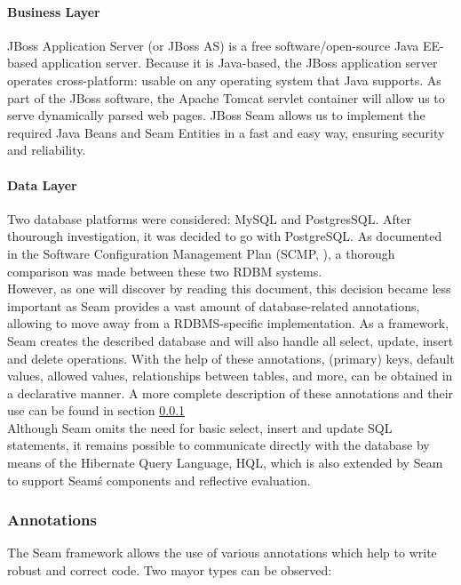 \documentclass[salesmen, twoside]{../../../templates/latex/2009/softproj}
\begin{document}
\begin{projdoc}
\paragraph{Business Layer}
JBoss Application Server (or JBoss AS) is a free software/open-source Java EE-based application server. Because it is Java-based, the JBoss application server operates cross-platform: usable on any operating system that Java supports. 
As part of the JBoss software, the Apache Tomcat servlet container will allow us to serve dynamically parsed web pages.
JBoss Seam allows us to implement the required Java Beans and Seam Entities in a fast and easy way, ensuring security and reliability.

\paragraph{Data Layer}
Two database platforms were considered: MySQL and PostgresSQL. After thourough investigation, it was decided to go with PostgreSQL. As documented in the Software Configuration Management Plan (SCMP, \cite{SCMP}), a thorough comparison was made between these two RDBM systems.\\
However, as one will discover by reading this document, this decision became less important as Seam provides a vast amount of database-related annotations, allowing to move away from a RDBMS-specific implementation. As a framework, Seam creates the described database and will also handle all select, update, insert and delete operations. With the help of these annotations, (primary) keys, default values, allowed values, relationships between tables, and more, can be obtained in a declarative manner. A more complete description of these annotations and their use can be found in section \ref{sec_annotations}\\
Although Seam omits the need for basic select, insert and update SQL statements, it remains possible to communicate directly with the database by means of the Hibernate Query Language, HQL, which is also extended by Seam to support Seam\'s components and reflective evaluation.

\subsubsection{Annotations}
\label{sec_annotations}
The Seam framework allows the use of various annotations which help to write robust and correct code. Two mayor types can be observed:

\end{projdoc}
\end{document}
